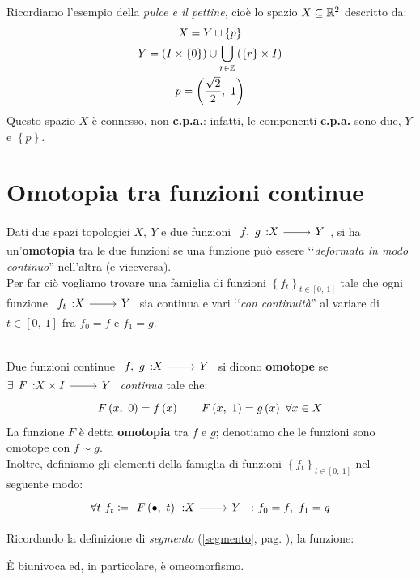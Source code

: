 \begin{example}
	Ricordiamo l'esempio della \textit{pulce e il pettine}, cioè lo spazio $X\subseteq \mathbb{R}^2$ descritto da:
	\begin{gather*}
		X=Y\cup \left\{p\right\}\\
		Y=\left(I\times \left\{0\right\}\right)\cup \bigcup_{r\in\mathbb{Z}}\left(\left\{r\right\}\times I\right)\\
		p=\left(\frac{\sqrt{2}}{2},\ 1\right)
	\end{gather*}
Questo spazio $X$ è connesso, non \textbf{c.p.a.}: infatti, le componenti \textbf{c.p.a.} sono due, $Y$ e $\left\{p\right\}$.
\end{example}
\section{Omotopia tra funzioni continue}
\begin{intuit}
	Dati due spazi topologici $X,\ Y$ e due funzioni $\funz{f,\ g}{X}{Y}$, si ha un'\textbf{omotopia} tra le due funzioni se una funzione può essere ‘‘\textit{deformata in modo continuo}'' nell'altra (e viceversa).\\
	Per far ciò vogliamo trovare una famiglia di funzioni $\left\{f_t\right\}_{t\in\left[0,\ 1\right]}$ tale che ogni funzione $\funz{f_t}{X}{Y}$ sia continua e vari ‘‘\textit{con continuità}'' al variare di $t\in\left[0,\ 1\right]$ fra $f_0=f$ e $f_1=g$.
\end{intuit}
\begin{define}[Omotopia.]~{}\\
	Due funzioni continue $\funz{f,\ g}{X}{Y}$ si dicono \textbf{omotope} se $\exists \funz{F}{X\times I}{Y}$ \textit{continua} tale che:
	\begin{equation}
		F\left(x,\ 0\right)=f\left(x\right)\qquad F\left(x,\ 1\right)=g\left(x\right)\ \forall x\in X
	\end{equation}
La funzione $F$ è detta \textbf{omotopia} tra $f$ e $g$; denotiamo che le funzioni sono omotope con $f\sim g$.\\
Inoltre, definiamo gli elementi della famiglia di funzioni $\left\{f_t\right\}_{t\in\left[0,\ 1\right]}$ nel  seguente modo:
\begin{equation}
\forall t\ f_t\coloneqq \funz{\mvf{F}{\bullet}{t}}{X}{Y}\ \colon f_0=f,\ f_1=g
\end{equation}
\vspace{-6mm}
\end{define}
\begin{observe}
Ricordando la definizione di \textit{segmento} (\autoref{segmento}, pag. \pageref{segmento}), la funzione:
\begin{center}
\end{center}
È biunivoca ed, in particolare, è omeomorfismo.
\end{observe}
